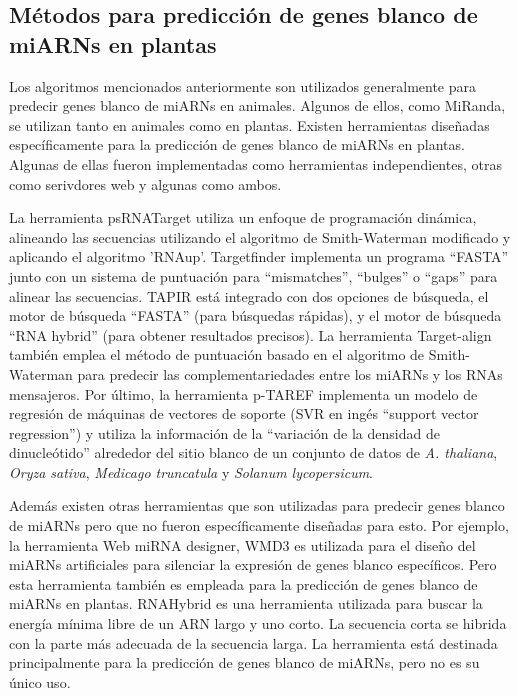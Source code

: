 \subsection{Métodos para predicción de genes blanco de miARNs en plantas}
Los algoritmos mencionados anteriormente son utilizados generalmente para predecir genes blanco de miARNs en animales.
Algunos de ellos, como MiRanda, se utilizan tanto en animales como en plantas.
Existen herramientas diseñadas específicamente para la predicción de genes blanco de miARNs en plantas.
Algunas de ellas fueron implementadas como herramientas independientes, otras como serivdores web y algunas como ambos.

La herramienta psRNATarget \citep{pmid21622958} utiliza un enfoque de programación dinámica, alineando las secuencias utilizando el algoritmo de Smith-Waterman modificado y aplicando el algoritmo 'RNAup'.
Targetfinder \citep{pmid15598838} implementa un programa ``FASTA'' junto con un sistema de puntuación para ``mismatches'', ``bulges'' o ``gaps'' para alinear las secuencias.
TAPIR \citep{pmid20430753} está integrado con dos opciones de búsqueda, el motor de búsqueda ``FASTA'' (para búsquedas rápidas), y el motor de búsqueda ``RNA hybrid'' (para obtener resultados precisos).
La herramienta Target-align \citep{pmid20934992} también emplea el método de puntuación basado en el algoritmo de Smith-Waterman para predecir las complementariedades entre los miARNs y los RNAs mensajeros.
Por último, la herramienta p-TAREF \citep{pmid22206472} implementa un modelo de regresión de máquinas de vectores de soporte (SVR en ingés ``support vector regression'') y utiliza la información de la ``variación de la densidad de dinucleótido'' alrededor del sitio blanco de un conjunto de datos de \textit{A. thaliana}, \textit{Oryza sativa}, \textit{Medicago truncatula} y \textit{Solanum lycopersicum}.

Además existen otras herramientas que son utilizadas para predecir genes blanco de miARNs pero que no fueron específicamente diseñadas para esto.
Por ejemplo, la herramienta  Web miRNA designer, WMD3 \citep{pmid18269576} es utilizada para el diseño del miARNs artificiales para silenciar la expresión de genes blanco específicos.
Pero esta herramienta también es empleada para la predicción de genes blanco de miARNs en plantas.
RNAHybrid \citep{Kruger01072006} es una herramienta utilizada para buscar la energía mínima libre de un ARN largo y uno corto.
La secuencia corta se hibrida con la parte más adecuada de la secuencia larga.
La herramienta está destinada principalmente para la predicción de genes blanco de miARNs, pero no es su único uso.

